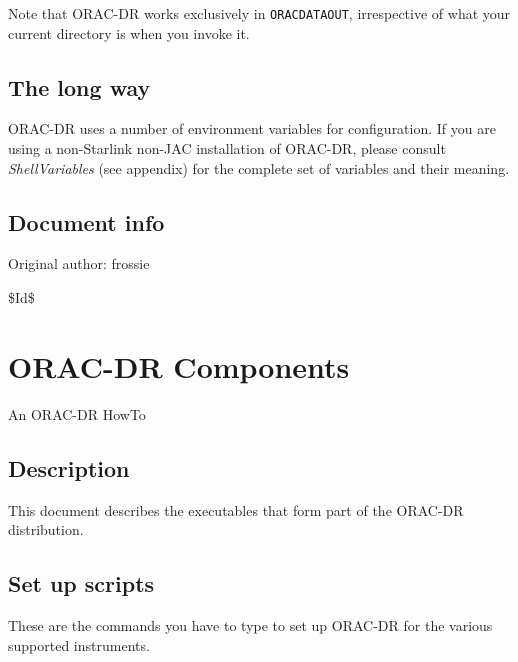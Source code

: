 \documentclass[twoside,11pt]{article}
\renewcommand{\_}{\texttt{\symbol{95}}}
\begin{document}
Note that ORAC-DR works exclusively in \texttt{ORAC\_DATA\_OUT}, irrespective of
what your current directory is when you invoke it.

\subsection*{The long way\label{Setting_up_to_run_oracdr_The_long_way}}


ORAC-DR uses a number of environment variables for configuration. If
you are using a non-Starlink non-JAC installation of ORAC-DR, please
consult \emph{ShellVariables} (see appendix) for the complete set of
variables and their meaning.

\subsection*{Document info\label{Setting_up_to_run_oracdr_Document_info}}


Original author: frossie



\$Id\$


\section{ORAC-DR Components\label{ORAC-DR_Components}}


An ORAC-DR HowTo

\subsection*{Description\label{ORAC-DR_Components_Description}}


This document describes the executables that form part of the ORAC-DR
distribution.

\subsection*{Set up scripts\label{ORAC-DR_Components_Set_up_scripts}}


These are the commands you have to type to set up ORAC-DR for the various
supported instruments.
\end{document}
